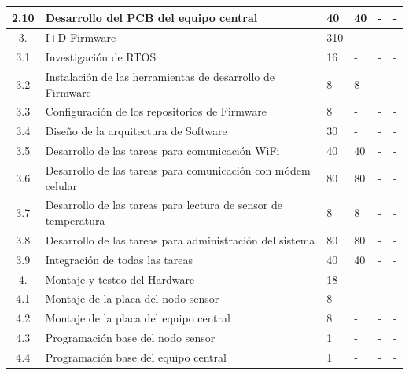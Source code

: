 \documentclass[11pt]{charter}
\begin{document}
\begin{table}
\label{tab:recursos}
\centering
\begin{tabularx}{\linewidth}{@{}|c|X|X|X|X|c|@{}}
\hline
 2.10   & Desarrollo del PCB del equipo central                                 &  40   &    40 &     - & - \\ \hline
 3.     & I+D Firmware                                                          & 310   &     - &     - & - \\ \hline
 3.1    & Investigación de RTOS                                                 & 16    &     - &     - & - \\ \hline
 3.2    & Instalación  de las herramientas de desarrollo de Firmware            & 8     &     8 &     - & - \\ \hline
 3.3    & Configuración de los repositorios de Firmware                         & 8     &     - &     - & - \\ \hline
 3.4    & Diseño de la arquitectura de Software                                 & 30    &     - &     - & - \\ \hline
 3.5    & Desarrollo de las tareas para comunicación WiFi                       & 40    &    40 &     - & - \\ \hline
 3.6    & Desarrollo de las tareas para comunicación con módem celular          & 80    &    80 &     - & - \\ \hline
 3.7    & Desarrollo de las tareas para lectura de sensor de temperatura        & 8     &     8 &     - & - \\ \hline
 3.8    & Desarrollo de las tareas para administración del sistema              & 80    &    80 &     - & - \\ \hline
 3.9    & Integración de todas las tareas                                       & 40    &    40 &     - & - \\ \hline
 4.     & Montaje y testeo del Hardware                                         & 18    &     - &     - & - \\ \hline
 4.1    & Montaje de la placa del nodo sensor                                   & 8     &     - &     - & - \\ \hline
 4.2    & Montaje de la placa del equipo central                                & 8     &     - &     - & - \\ \hline
 4.3    & Programación base del nodo sensor                                     & 1     &     - &     - & - \\ \hline
 4.4    & Programación base del equipo central                                  & 1     &     - &     - & - \\ \hline
\end{tabularx}%
\end{table}
\end{document}
